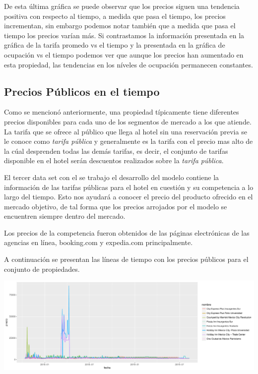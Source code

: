 De esta última gráfica se puede observar que los precios siguen una tendencia positiva con respecto al tiempo, a medida que pasa el tiempo, los precios incrementan, sin embargo podemos notar también que a medida que pasa el tiempo los precios varían más. Si contrastamos la información presentada en la gráfica de la tarifa promedo vs el tiempo y la presentada en la gráfica de ocupación vs el tiempo podemos ver que aunque los precios han aumentado en esta propiedad, las tendencias en los níveles de ocupación permanecen constantes.

\subsection*{Precios Públicos en el tiempo}

Como se mencionó anteriormente, una propiedad típicamente tiene diferentes precios disponibles para cada uno de los segmentos de mercado a los que atiende. La tarifa que se ofrece al público que llega al hotel sin una reservación previa se le conoce como \emph{tarifa pública} y generalmente es la tarifa con el precio mas alto de la cúal desprenden todas las demás tarifas, es decir, el conjunto de tarifas disponible en el hotel serán descuentos realizados sobre la \emph{tarifa pública}.

El tercer data set con el se trabajo el desarrollo del modelo contiene la información de las tarifas públicas para el hotel en cuestión y su competencia a lo largo del tiempo. Esto nos ayudará a conocer el precio del producto ofrecido en el mercado objetivo, de tal forma que los precios arrojados por el modelo se encuentren siempre dentro del mercado.

Los precios de la competencia fueron obtenidos de las páginas electrónicas de las agencias en línea, booking.com y expedia.com principalmente.

A continuación se presentan las líneas de tiempo con los precios públicos para el conjunto de propiedades.

\color{fgcolor}
\includegraphics[width=\maxwidth]{figures/PreciosGraf-1} 

